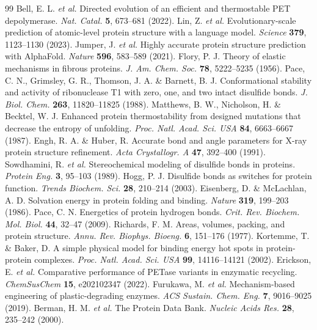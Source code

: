 \documentclass[10pt,twocolumn,a4paper]{article}
\begin{document}
\begin{thebibliography}{99}
 Bell, E. L. \textit{et al.} Directed evolution of an efficient and thermostable PET depolymerase. \textit{Nat. Catal.} \textbf{5}, 673--681 (2022).
 Lin, Z. \textit{et al.} Evolutionary-scale prediction of atomic-level protein structure with a language model. \textit{Science} \textbf{379}, 1123--1130 (2023).
 Jumper, J. \textit{et al.} Highly accurate protein structure prediction with AlphaFold. \textit{Nature} \textbf{596}, 583--589 (2021).
 Flory, P. J. Theory of elastic mechanisms in fibrous proteins. \textit{J. Am. Chem. Soc.} \textbf{78}, 5222--5235 (1956).
 Pace, C. N., Grimsley, G. R., Thomson, J. A. \& Barnett, B. J. Conformational stability and activity of ribonuclease T1 with zero, one, and two intact disulfide bonds. \textit{J. Biol. Chem.} \textbf{263}, 11820--11825 (1988).
 Matthews, B. W., Nicholson, H. \& Becktel, W. J. Enhanced protein thermostability from designed mutations that decrease the entropy of unfolding. \textit{Proc. Natl. Acad. Sci. USA} \textbf{84}, 6663--6667 (1987).
 Engh, R. A. \& Huber, R. Accurate bond and angle parameters for X-ray protein structure refinement. \textit{Acta Crystallogr. A} \textbf{47}, 392--400 (1991).
 Sowdhamini, R. \textit{et al.} Stereochemical modeling of disulfide bonds in proteins. \textit{Protein Eng.} \textbf{3}, 95--103 (1989).
 Hogg, P. J. Disulfide bonds as switches for protein function. \textit{Trends Biochem. Sci.} \textbf{28}, 210--214 (2003).
 Eisenberg, D. \& McLachlan, A. D. Solvation energy in protein folding and binding. \textit{Nature} \textbf{319}, 199--203 (1986).
 Pace, C. N. Energetics of protein hydrogen bonds. \textit{Crit. Rev. Biochem. Mol. Biol.} \textbf{44}, 32--47 (2009).
 Richards, F. M. Areas, volumes, packing, and protein structure. \textit{Annu. Rev. Biophys. Bioeng.} \textbf{6}, 151--176 (1977).
 Kortemme, T. \& Baker, D. A simple physical model for binding energy hot spots in protein-protein complexes. \textit{Proc. Natl. Acad. Sci. USA} \textbf{99}, 14116--14121 (2002).
 Erickson, E. \textit{et al.} Comparative performance of PETase variants in enzymatic recycling. \textit{ChemSusChem} \textbf{15}, e202102347 (2022).
 Furukawa, M. \textit{et al.} Mechanism-based engineering of plastic-degrading enzymes. \textit{ACS Sustain. Chem. Eng.} \textbf{7}, 9016--9025 (2019).
 Berman, H. M. \textit{et al.} The Protein Data Bank. \textit{Nucleic Acids Res.} \textbf{28}, 235--242 (2000).
\end{thebibliography}
\end{document}
